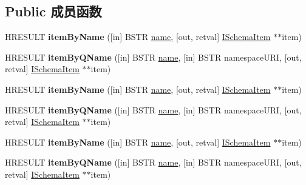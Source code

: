 \subsection*{Public 成员函数}
\begin{DoxyCompactItemize}
\item 
\mbox{\label{interface_m_s_x_m_l2_1_1_i_schema_item_collection_a434f19a7ded6e4c2d209c1faeb7b6b11}} 
H\+R\+E\+S\+U\+LT {\bfseries item\+By\+Name} (\mbox{[}in\mbox{]} B\+S\+TR \hyperlink{structname}{name}, \mbox{[}out, retval\mbox{]} \hyperlink{interface_m_s_x_m_l2_1_1_i_schema_item}{I\+Schema\+Item} $\ast$$\ast$item)
\item 
\mbox{\label{interface_m_s_x_m_l2_1_1_i_schema_item_collection_a5aef206729277a3379e38d1b172ac838}} 
H\+R\+E\+S\+U\+LT {\bfseries item\+By\+Q\+Name} (\mbox{[}in\mbox{]} B\+S\+TR \hyperlink{structname}{name}, \mbox{[}in\mbox{]} B\+S\+TR namespace\+U\+RI, \mbox{[}out, retval\mbox{]} \hyperlink{interface_m_s_x_m_l2_1_1_i_schema_item}{I\+Schema\+Item} $\ast$$\ast$item)
\item 
\mbox{\label{interface_m_s_x_m_l2_1_1_i_schema_item_collection_a434f19a7ded6e4c2d209c1faeb7b6b11}} 
H\+R\+E\+S\+U\+LT {\bfseries item\+By\+Name} (\mbox{[}in\mbox{]} B\+S\+TR \hyperlink{structname}{name}, \mbox{[}out, retval\mbox{]} \hyperlink{interface_m_s_x_m_l2_1_1_i_schema_item}{I\+Schema\+Item} $\ast$$\ast$item)
\item 
\mbox{\label{interface_m_s_x_m_l2_1_1_i_schema_item_collection_a5aef206729277a3379e38d1b172ac838}} 
H\+R\+E\+S\+U\+LT {\bfseries item\+By\+Q\+Name} (\mbox{[}in\mbox{]} B\+S\+TR \hyperlink{structname}{name}, \mbox{[}in\mbox{]} B\+S\+TR namespace\+U\+RI, \mbox{[}out, retval\mbox{]} \hyperlink{interface_m_s_x_m_l2_1_1_i_schema_item}{I\+Schema\+Item} $\ast$$\ast$item)
\item 
\mbox{\label{interface_m_s_x_m_l2_1_1_i_schema_item_collection_a434f19a7ded6e4c2d209c1faeb7b6b11}} 
H\+R\+E\+S\+U\+LT {\bfseries item\+By\+Name} (\mbox{[}in\mbox{]} B\+S\+TR \hyperlink{structname}{name}, \mbox{[}out, retval\mbox{]} \hyperlink{interface_m_s_x_m_l2_1_1_i_schema_item}{I\+Schema\+Item} $\ast$$\ast$item)
\item 
\mbox{\label{interface_m_s_x_m_l2_1_1_i_schema_item_collection_a5aef206729277a3379e38d1b172ac838}} 
H\+R\+E\+S\+U\+LT {\bfseries item\+By\+Q\+Name} (\mbox{[}in\mbox{]} B\+S\+TR \hyperlink{structname}{name}, \mbox{[}in\mbox{]} B\+S\+TR namespace\+U\+RI, \mbox{[}out, retval\mbox{]} \hyperlink{interface_m_s_x_m_l2_1_1_i_schema_item}{I\+Schema\+Item} $\ast$$\ast$item)
\end{DoxyCompactItemize}
